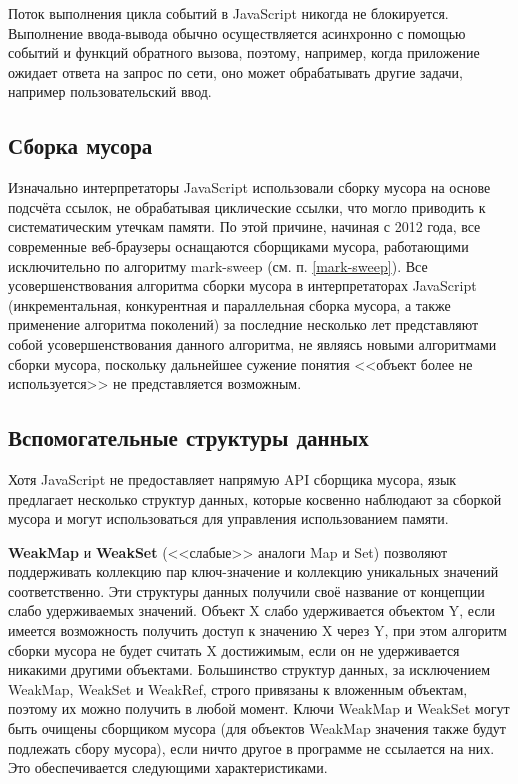 Поток выполнения цикла событий в JavaScript никогда не блокируется. Выполнение ввода-вывода обычно осуществляется асинхронно с помощью событий и функций обратного вызова, поэтому, например, когда приложение ожидает ответа на запрос по сети, оно может обрабатывать другие задачи, например пользовательский ввод. \cite{js_event_loop}



\subsection{Сборка мусора}

Изначально интерпретаторы JavaScript использовали сборку мусора на основе подсчёта ссылок, не обрабатывая циклические ссылки, что могло приводить к систематическим утечкам памяти. По этой причине, начиная с 2012 года, все современные веб-браузеры оснащаются сборщиками мусора, работающими исключительно по алгоритму mark-sweep (см. п. \ref{mark-sweep}). Все усовершенствования алгоритма сборки мусора в интерпретаторах JavaScript (инкрементальная, конкурентная и параллельная сборка мусора, а также применение алгоритма поколений) за последние несколько лет представляют собой усовершенствования данного алгоритма, не являясь новыми алгоритмами сборки мусора, поскольку дальнейшее сужение понятия <<объект более не используется>> не представляется возможным. \cite{js_memory}



\subsection{Вспомогательные структуры данных}

Хотя JavaScript не предоставляет напрямую API сборщика мусора, язык предлагает несколько структур данных, которые косвенно наблюдают за сборкой мусора и могут использоваться для управления использованием памяти.~\cite{js_memory}

\textbf{WeakMap} и \textbf{WeakSet} (<<слабые>> аналоги Map и Set) позволяют поддерживать коллекцию пар ключ-значение и коллекцию уникальных значений соответственно. Эти структуры данных получили своё название от концепции слабо удерживаемых значений. Объект X слабо удерживается объектом Y, если имеется возможность получить доступ к значению X через Y, при этом алгоритм сборки мусора не будет считать X достижимым, если он не удерживается никакими другими объектами. Большинство структур данных, за исключением WeakMap, WeakSet и WeakRef, строго привязаны к вложенным объектам, поэтому их можно получить в любой момент. Ключи WeakMap и WeakSet могут быть очищены сборщиком мусора (для объектов WeakMap значения также будут подлежать сбору мусора), если ничто другое в программе не ссылается на них. Это обеспечивается следующими характеристиками. \cite{js_memory}

